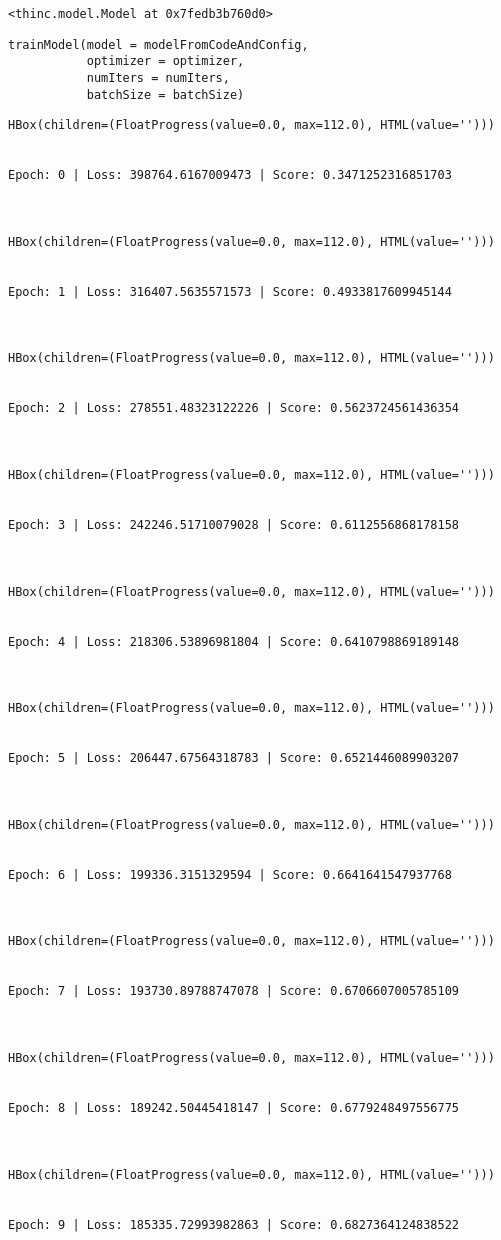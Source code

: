 \documentclass[
]{article}
\begin{document}
\begin{verbatim}
<thinc.model.Model at 0x7fedb3b760d0>
\end{verbatim}

\begin{verbatim}
trainModel(model = modelFromCodeAndConfig,
           optimizer = optimizer,
           numIters = numIters,
           batchSize = batchSize)
\end{verbatim}

\begin{verbatim}
HBox(children=(FloatProgress(value=0.0, max=112.0), HTML(value='')))


Epoch: 0 | Loss: 398764.6167009473 | Score: 0.3471252316851703



HBox(children=(FloatProgress(value=0.0, max=112.0), HTML(value='')))


Epoch: 1 | Loss: 316407.5635571573 | Score: 0.4933817609945144



HBox(children=(FloatProgress(value=0.0, max=112.0), HTML(value='')))


Epoch: 2 | Loss: 278551.48323122226 | Score: 0.5623724561436354



HBox(children=(FloatProgress(value=0.0, max=112.0), HTML(value='')))


Epoch: 3 | Loss: 242246.51710079028 | Score: 0.6112556868178158



HBox(children=(FloatProgress(value=0.0, max=112.0), HTML(value='')))


Epoch: 4 | Loss: 218306.53896981804 | Score: 0.6410798869189148



HBox(children=(FloatProgress(value=0.0, max=112.0), HTML(value='')))


Epoch: 5 | Loss: 206447.67564318783 | Score: 0.6521446089903207



HBox(children=(FloatProgress(value=0.0, max=112.0), HTML(value='')))


Epoch: 6 | Loss: 199336.3151329594 | Score: 0.6641641547937768



HBox(children=(FloatProgress(value=0.0, max=112.0), HTML(value='')))


Epoch: 7 | Loss: 193730.89788747078 | Score: 0.6706607005785109



HBox(children=(FloatProgress(value=0.0, max=112.0), HTML(value='')))


Epoch: 8 | Loss: 189242.50445418147 | Score: 0.6779248497556775



HBox(children=(FloatProgress(value=0.0, max=112.0), HTML(value='')))


Epoch: 9 | Loss: 185335.72993982863 | Score: 0.6827364124838522
\end{verbatim}
\end{document}
